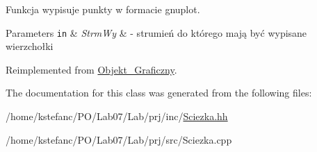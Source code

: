 Funkcja wypisuje punkty w formacie gnuplot. 


\begin{DoxyParams}[1]{Parameters}
\mbox{\tt in}  & {\em Strm\+Wy} & -\/ strumień do którego mają być wypisane wierzchołki \\
\hline
\end{DoxyParams}


Reimplemented from \hyperlink{class_objekt___graficzny_ac6c74e172b8d7b1af225d9d715aa2adb}{Objekt\+\_\+\+Graficzny}.



The documentation for this class was generated from the following files\+:\begin{DoxyCompactItemize}
\item 
/home/kstefanc/\+P\+O/\+Lab07/\+Lab/prj/inc/\hyperlink{_sciezka_8hh}{Sciezka.\+hh}\item 
/home/kstefanc/\+P\+O/\+Lab07/\+Lab/prj/src/Sciezka.\+cpp\end{DoxyCompactItemize}
